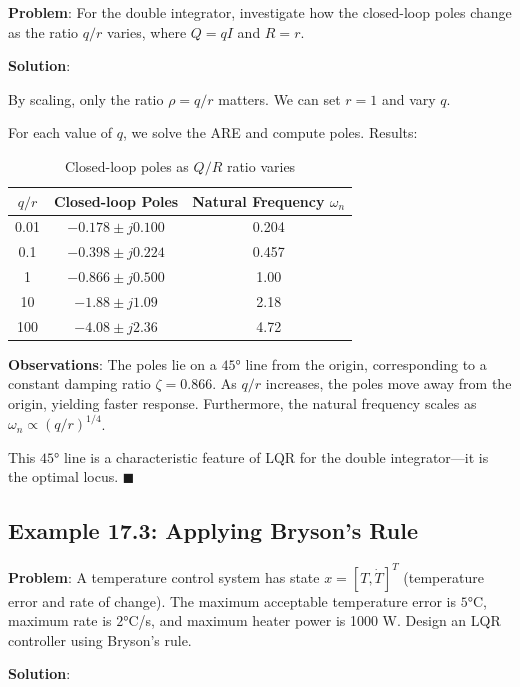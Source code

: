 \begin{examplebox}

\textbf{Problem}: For the double integrator, investigate how the closed-loop poles change as the ratio $q/r$ varies, where $Q = qI$ and $R = r$.

\textbf{Solution}:

By scaling, only the ratio $\rho = q/r$ matters. We can set $r = 1$ and vary $q$.

For each value of $q$, we solve the ARE and compute poles. Results:

\begin{table}[H]
\centering
\caption{Closed-loop poles as $Q/R$ ratio varies}
\begin{tabular}{ccc}
\toprule
$q/r$ & Closed-loop Poles & Natural Frequency $\omega_n$ \\
\midrule
0.01 & $-0.178 \pm j0.100$ & 0.204 \\
0.1 & $-0.398 \pm j0.224$ & 0.457 \\
1 & $-0.866 \pm j0.500$ & 1.00 \\
10 & $-1.88 \pm j1.09$ & 2.18 \\
100 & $-4.08 \pm j2.36$ & 4.72 \\
\bottomrule
\end{tabular}
\end{table}

\textbf{Observations}: The poles lie on a $45°$ line from the origin, corresponding to a constant damping ratio $\zeta = 0.866$. As $q/r$ increases, the poles move away from the origin, yielding faster response. Furthermore, the natural frequency scales as $\omega_n \propto (q/r)^{1/4}$.

This $45°$ line is a characteristic feature of LQR for the double integrator---it is the optimal locus. $\blacksquare$
\end{examplebox}

\subsection{Example 17.3: Applying Bryson's Rule}

\textbf{Problem}: A temperature control system has state $x = [T, \dot{T}]^T$ (temperature error and rate of change). The maximum acceptable temperature error is $5°$C, maximum rate is $2°$C/s, and maximum heater power is 1000 W. Design an LQR controller using Bryson's rule.

\textbf{Solution}:

